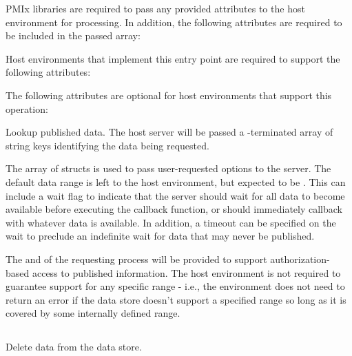 \reqattrstart
\ac{PMIx} libraries are required to pass any provided attributes to the host environment for processing. In addition, the following attributes are required to be included in the passed  array:


Host environments that implement this entry point are required to support the following attributes:


\reqattrend

\optattrstart
The following attributes are optional for host environments that support this operation:


\optattrend


\descr

Lookup published data.
The host server will be passed a -terminated array of string keys identifying the data being requested.

The array of  structs is used to pass user-requested options to the server. The default data range is left to the host environment, but expected to be .
This can include a wait flag to indicate that the server should wait for all data to become available before executing the callback function, or should immediately callback with whatever data is available.
In addition, a timeout can be specified on the wait to preclude an indefinite wait for data that may never be published.

\advicermstart
The  and  of the requesting process will be provided to support authorization-based access to published information. The host environment is not required to guarantee support for any specific range - i.e., the environment does not need to return an error if the data store doesn't support a specified range so long as it is covered by some internally defined range.
\advicermend

\subsection{}

\summary

Delete data from the data store.

